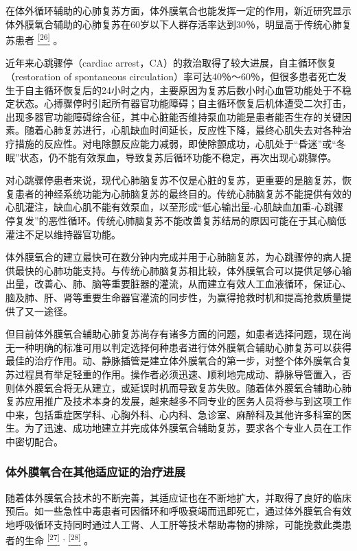 在体外循环辅助的心肺复苏方面，体外膜氧合也能发挥一定的作用，新近研究显示体外膜氧合辅助的心肺复苏在60岁以下人群存活率达到30％，明显高于传统心肺复苏患者
\protect\hyperlink{text00030.htmlux5cux23ch26-29}{\textsuperscript{{[}26{]}}}
。

近年来心跳骤停（cardiac
arrest，CA）的救治取得了较大进展，自主循环恢复（restoration of
spontaneous
circulation）率可达40％～60％，但很多患者死亡发生于自主循环恢复后的24小时之内，主要原因为复苏后数小时心血管功能处于不稳定状态。心搏骤停时引起所有器官功能障碍；自主循环恢复后机体遭受二次打击，出现多器官功能障碍综合征，其中心脏能否维持泵血功能是患者能否生存的关键因素。随着心肺复苏进行，心肌缺血时间延长，反应性下降，最终心肌失去对各种治疗措施的反应性。对电除颤反应能力减弱，即使除颤成功，心肌处于“昏迷”或“冬眠”状态，仍不能有效泵血，导致复苏后循环功能不稳定，再次出现心跳骤停。

对心跳骤停患者来说，现代心肺脑复苏不仅是心脏的复苏，更重要的是脑复苏，恢复患者的神经系统功能为心肺脑复苏的最终目的。传统心肺脑复苏不能提供有效的心肌灌注，缺血心肌不能有效泵血，以至形成“低心输出量-心肌缺血加重-心跳骤停复发”的恶性循环。传统心肺脑复苏不能改善复苏结局的原因可能在于其心脑低灌注不足以维持器官功能。

体外膜氧合的建立最快可在数分钟内完成并用于心肺脑复苏，为心跳骤停的病人提供最快的心肺功能支持。与传统心肺脑复苏相比较，体外膜氧合可以提供足够心输出量，改善心、肺、脑等重要脏器的灌流，从而建立有效人工血液循环，保证心、脑及肺、肝、肾等重要生命器官灌流的同步性，为赢得抢救时机和提高抢救质量提供了又一途径。

但目前体外膜氧合辅助心肺复苏尚存有诸多方面的问题，如患者选择问题，现在尚无一种明确的标准可用以判定选择何种患者进行体外膜氧合辅助心肺复苏可以获得最佳的治疗作用。动、静脉插管是建立体外膜氧合的第一步，对整个体外膜氧合复苏过程具有举足轻重的作用。操作者必须迅速、顺利地完成动、静脉导管置入，否则体外膜氧合将无从建立，或延误时机而导致复苏失败。随着体外膜氧合辅助心肺复苏应用推广及技术本身的发展，越来越多不同专业的医务人员将参与到这项工作中来，包括重症医学科、心胸外科、心内科、急诊室、麻醉科及其他许多科室的医生。为了迅速、成功地建立并完成体外膜氧合辅助复苏，要求各个专业人员在工作中密切配合。

\subsubsection{体外膜氧合在其他适应证的治疗进展}

随着体外膜氧合技术的不断完善，其适应证也在不断地扩大，并取得了良好的临床预后。如一些急性中毒患者可因循环和呼吸衰竭而迅即死亡，通过体外膜氧合有效地呼吸循环支持同时通过人工肾、人工肝等技术帮助毒物的排除，可能挽救此类患者的生命
\protect\hyperlink{text00030.htmlux5cux23ch27-29}{\textsuperscript{{[}27{]}}}
\textsuperscript{,}
\protect\hyperlink{text00030.htmlux5cux23ch28-29}{\textsuperscript{{[}28{]}}}
。

